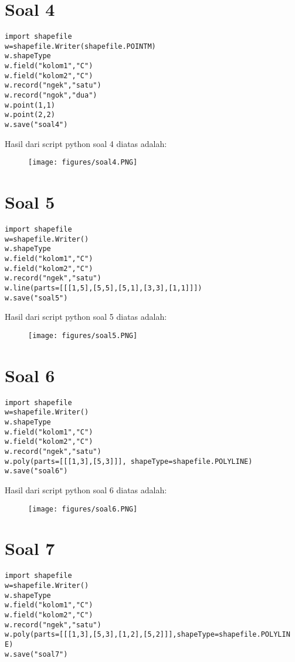 \section{Soal 4}
\begin{verbatim}
import shapefile
w=shapefile.Writer(shapefile.POINTM)
w.shapeType
w.field("kolom1","C")
w.field("kolom2","C")
w.record("ngek","satu")
w.record("ngok","dua")
w.point(1,1)
w.point(2,2)
w.save("soal4")
\end{verbatim}

\par Hasil dari script python soal 4 diatas adalah: 
\begin{figure}[!htbp]
    \centering
    \texttt{[image: figures/soal4.PNG]}
    \label{soal4}
\end{figure}

\section{Soal 5}
\begin{verbatim}
import shapefile
w=shapefile.Writer()
w.shapeType
w.field("kolom1","C")
w.field("kolom2","C")
w.record("ngek","satu")
w.line(parts=[[[1,5],[5,5],[5,1],[3,3],[1,1]]])
w.save("soal5")
\end{verbatim}

\par Hasil dari script python soal 5 diatas adalah: 
\begin{figure}[!htbp]
    \centering
    \texttt{[image: figures/soal5.PNG]}
    \label{soal5}
\end{figure}

\section{Soal 6}
\begin{verbatim}
import shapefile
w=shapefile.Writer()
w.shapeType
w.field("kolom1","C")
w.field("kolom2","C")
w.record("ngek","satu")
w.poly(parts=[[[1,3],[5,3]]], shapeType=shapefile.POLYLINE)
w.save("soal6")
\end{verbatim}

\par Hasil dari script python soal 6 diatas adalah: 
\begin{figure}[!htbp]
    \centering
    \texttt{[image: figures/soal6.PNG]}
    \label{soal6}
\end{figure}

\section{Soal 7}
\begin{verbatim}
import shapefile
w=shapefile.Writer()
w.shapeType
w.field("kolom1","C")
w.field("kolom2","C")
w.record("ngek","satu")
w.poly(parts=[[[1,3],[5,3],[1,2],[5,2]]],shapeType=shapefile.POLYLIN
E)
w.save("soal7")
\end{verbatim}

